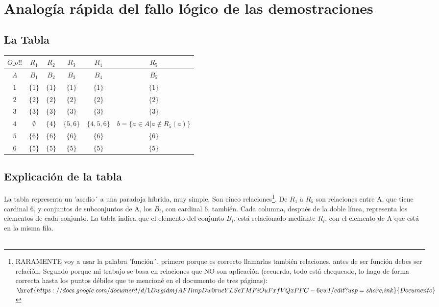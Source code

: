 \chapter{Analogía rápida del fallo lógico de las demostraciones}

	\section{La Tabla}
	\begin{table}[h!]
		\begin{tabular}{|c|c|c|c|c|c|}
			\hline
			$O\_o!!$ & $R_{1}$ & $R_{2}$ & $R_{3}$ & $R_{4}$ & $R_{5}$ \\
			\hline
			$A$ & $B_{1}$ & $B_{2}$ & $B_{3}$ & $B_{4}$ & $B_{5}$ \\
			\hline
			\hline
			$1$ & $\{1\}$ & $\{1\}$ & $\{1\}$ & $\{1\}$ &$\{1\}$  \\
			\hline
			$2$ & $\{2\}$ & $\{2\}$ & $\{2\}$ & $\{2\}$ &$\{2\}$\\
			\hline
			$3$ & $\{3\}$ & $\{3\}$ & $\{3\}$ & $\{3\}$ &$\{3\}$\\
			\hline
			$4$ & $\emptyset$ & $\{4\}$ & $\{5,6\}$ & $\{4,5,6\}$ & $b=\{a \in A | a \notin R_{5}(a) \}$ \\
			\hline
			$5$ & $\{6\}$ & $\{6\}$ & $\{6\}$ & $\{6\}$ &$\{6\}$\\
			\hline
			$6$ & $\{5\}$ & $\{5\}$ & $\{5\}$ & $\{5\}$ &$\{5\}$ \\
			\hline 
		\end{tabular}
	\end{table}

	\section{Explicación de la tabla}
	
	\noindent
	La tabla representa un 'asedio´ a una paradoja híbrida, muy simple. Son cinco relaciones\footnote{
		RARAMENTE voy a usar la palabra 'función´, primero porque es correcto llamarlas también relaciones, antes de ser función debes ser relación. Segundo porque mi trabajo se basa en relaciones que NO son aplicación (recuerda, todo está chequeado, lo hago de forma correcta hasta los puntos débiles que te mencioné en el documento de tres páginas): 
		$\href{https://docs.google.com/document/d/1DwgidmjAFIlmpDw0rucYLSeTMFiOuFxfVQxPFC-6vwI/edit?usp=share_link}{Documento}$
	}. De $R_{1}$ a $R_{5}$ son relaciones entre A, que tiene cardinal 6, y conjuntos de subconjuntos de A, los $B_{i}$, con cardinal 6, también. Cada columna, después de la doble línea, representa los elementos de cada conjunto. La tabla indica que el elemento del conjunto $B_{i}$, está relacionado mediante $R_{i}$, con el elemento de A que está en la misma fila.\\\\

